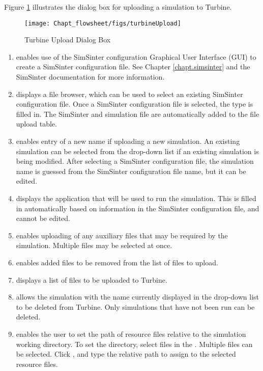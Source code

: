 Figure \ref{fig.turbine.upload} illustrates the dialog box for uploading a simulation to Turbine.
\begin{figure}[H]
	\begin{center}
		\texttt{[image: Chapt\_flowsheet/figs/turbineUpload]}
		\caption{Turbine Upload Dialog Box}
		\label{fig.turbine.upload}
	\end{center}
\end{figure}
\begin{enumerate}
	\item {} enables use of the SimSinter configuration Graphical User Interface (GUI) to create a SimSinter configuration file. See Chapter \ref{chapt.simsinter} and the SimSinter documentation for more information.
	\item {} displays a file browser, which can be used to select an existing SimSinter configuration file. Once a SimSinter configuration file is selected, the  type is filled in. The SimSinter  and simulation file are automatically added to the file upload table.
	\item {} enables entry of a new name if uploading a new simulation. An existing simulation can be selected from the drop-down list if an existing simulation is being modified. After selecting a SimSinter configuration file, the simulation name is guessed from the SimSinter configuration file name, but it can be edited.
	\item {} displays the application that will be used to run the simulation. This is filled in automatically based on information in the SimSinter configuration file, and cannot be edited.
	\item {} enables uploading of any auxiliary files that may be required by the simulation. Multiple files may be selected at once.
	\item {} enables added files to be removed from the list of files to upload.
	\item {} displays a list of files to be uploaded to Turbine.
	\item {} allows the simulation with the name currently displayed in the  drop-down list to be deleted from Turbine. Only simulations that have not been run can be deleted.
	\item {} enables the user to set the path of resource files relative to the simulation working directory. To set the directory, select files in the . Multiple files can be selected. Click , and type the relative path to assign to the selected resource files.

\end{enumerate}
